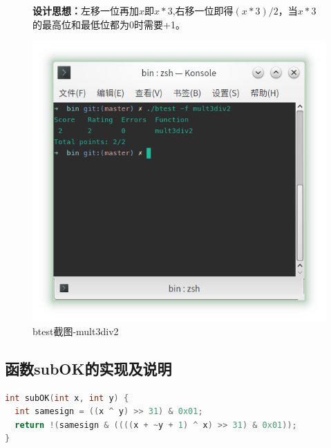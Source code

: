 \begin{figure}[H]
    \begin{minipage}[c]{0.5\linewidth}
        \textbf{设计思想：}左移一位再加$x$即$x*3$,右移一位即得$(x*3)/2$，当$x*3$的最高位和最低位都为0时需要+1。
    \end{minipage}
    \begin{minipage}[c]{0.4\linewidth}
        \centering
        \includegraphics[width=0.9\linewidth]{figures/mult3div2}
        \caption{btest截图-mult3div2}
        \label{fig:mult3div2}
    \end{minipage}
\end{figure}

\subsection{函数subOK的实现及说明}

\begin{lstlisting}[language = c]
int subOK(int x, int y) {
  int samesign = ((x ^ y) >> 31) & 0x01;
  return !(samesign & ((((x + ~y + 1) ^ x) >> 31) & 0x01));
}
\end{lstlisting}

